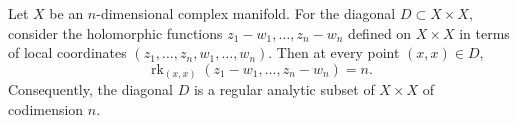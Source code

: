 Let $X$ be an $n$-dimensional complex manifold. For the diagonal $D \subset X \times X$, consider the holomorphic functions $z_1 - w_1, \ldots, z_n - w_n$ defined on $X \times X$ in terms of local coordinates $(z_1, \ldots, z_n, w_1, \ldots, w_n)$. Then at every point $(x, x) \in D$,
$$\operatorname{rk}_{(x, x)}(z_1 - w_1, \ldots, z_n - w_n) = n.$$
Consequently, the diagonal $D$ is a regular analytic subset of $X \times X$ of codimension $n$.

